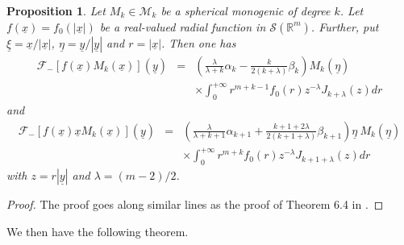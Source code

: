 \documentclass{amsart}
\newtheorem{proposition}[theorem]{Proposition}
\theoremstyle{remark}
\begin{document}
\begin{proposition}
\label{Bochner}
Let $M_{k} \in {\mathcal{M}}_{k}$ be a spherical monogenic of degree $k$. Let $f({\underline{x}})= f_0(|{\underline{x}}|)$ be a real-valued radial function in 
${\mathcal{S}}({{\mathbb R}}^m)$. Further, put $\underline{\xi}= {\underline{x}}/|{\underline{x}}|$, $\underline{\eta} = {\underline{y}}/|{\underline{y}}|$ and $r = |{\underline{x}}|$. Then one has
\begin{eqnarray*} 
{\mathcal{F}}_{-} \left\lbrack f({\underline{x}})M_{k}({\underline{x}}) \right\rbrack ({\underline{y}}) &=& \left( \frac{{\lambda}}{{{\lambda}}+k} \alpha_{k} - \frac{k}{2(k+ {{\lambda}})} \beta_k \right)  M_{k}(\underline{\eta})\\
&&\times \int_{0}^{+\infty} r^{m+k-1}f_0(r)   z^{-{{\lambda}}} J_{k + {{\lambda}}}(z)  dr
\end{eqnarray*}
and
\begin{eqnarray*}
{\mathcal{F}}_{-} \left\lbrack f({\underline{x}}) {\underline{x}} M_{k}({\underline{x}}) \right\rbrack ({\underline{y}}) &=& \left( \frac{{\lambda}}{{{\lambda}}+k+1} \alpha_{k+1} + \frac{k+1+2{{\lambda}}}{2(k+1+ {{\lambda}})} \beta_{k+1} \right)  \underline{\eta} \  M_{k}(\underline{\eta})\\
&&\times \int_{0}^{+\infty} r^{m+k}f_0(r)   z^{-{{\lambda}}} J_{k +1+ {{\lambda}}}(z)  dr
\end{eqnarray*}
with $z= r |{\underline{y}}|$ and ${{\lambda}} = (m-2)/2$.
\end{proposition}

\begin{proof}
The proof goes along similar lines as the proof of Theorem 6.4 in \cite{DBXu}.
\end{proof}

We then have the following theorem.
\end{document}

